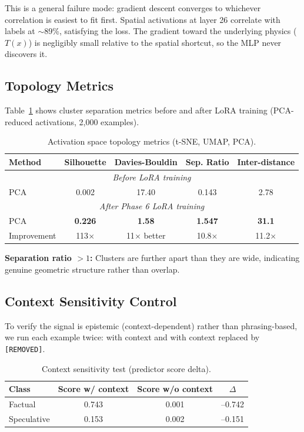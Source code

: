 \documentclass[11pt,a4paper]{article}
\begin{document}
This is a general failure mode: gradient descent converges to whichever correlation is easiest to fit first. Spatial activations at layer 26 correlate with labels at $\sim$89\%, satisfying the loss. The gradient toward the underlying physics ($T(x)$) is negligibly small relative to the spatial shortcut, so the MLP never discovers it.

\subsection{Topology Metrics}

Table~\ref{tab:topology} shows cluster separation metrics before and after LoRA training (PCA-reduced activations, 2,000 examples).

\begin{table}[h]
\centering
\caption{Activation space topology metrics (t-SNE, UMAP, PCA).}
\label{tab:topology}
\begin{tabular}{lcccc}
\toprule
Method & Silhouette & Davies-Bouldin & Sep. Ratio & Inter-distance \\
\midrule
\multicolumn{5}{c}{\textit{Before LoRA training}} \\
PCA & 0.002 & 17.40 & 0.143 & 2.78 \\
\midrule
\multicolumn{5}{c}{\textit{After Phase 6 LoRA training}} \\
PCA & \textbf{0.226} & \textbf{1.58} & \textbf{1.547} & \textbf{31.1} \\
\midrule
Improvement & 113$\times$ & 11$\times$ better & 10.8$\times$ & 11.2$\times$ \\
\bottomrule
\end{tabular}
\end{table}

\textbf{Separation ratio $> 1$:} Clusters are further apart than they are wide, indicating genuine geometric structure rather than overlap.

\subsection{Context Sensitivity Control}

To verify the signal is epistemic (context-dependent) rather than phrasing-based, we run each example twice: with context and with context replaced by \texttt{[REMOVED]}.

\begin{table}[h]
\centering
\caption{Context sensitivity test (predictor score delta).}
\label{tab:context}
\begin{tabular}{lccc}
\toprule
Class & Score w/ context & Score w/o context & $\Delta$ \\
\midrule
Factual & 0.743 & 0.001 & --0.742 \\
Speculative & 0.153 & 0.002 & --0.151 \\
\bottomrule
\end{tabular}
\end{table}
\end{document}
